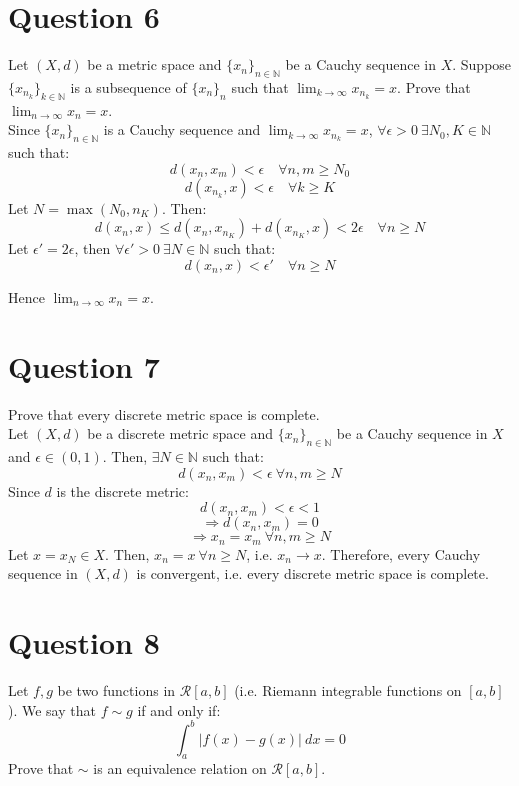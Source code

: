 \documentclass{article}
\begin{document}
\section{Question 6}

	Let $(X, d)$ be a metric space and $\{x_n\}_{n \in \mathbb{N}}$ be a Cauchy sequence in $X$.
	Suppose $\{x_{n_k}\}_{k \in \mathbb{N}}$ is a subsequence of $\{x_n\}_n$ such that 
	$\lim_{k \to \infty} x_{n_k} = x$.
	Prove that $\lim_{n \to \infty} x_n = x$. \\

	Since $\{x_n\}_{n \in \mathbb{N}}$ is a Cauchy sequence and $\lim_{k \to \infty} x_{n_k} = x$,
	$\forall \epsilon > 0 ~ \exists N_0, K \in \mathbb{N}$ such that:
	\[ d(x_n, x_m) < \epsilon \quad \forall n, m \ge N_0 \]
	\[ d(x_{n_k}, x) < \epsilon \quad \forall k \ge K \]
	Let $N = \max(N_0, n_K)$.
	Then:
	\[
		d(x_n, x) \le d(x_n, x_{n_K}) + d(x_{n_K}, x) < 2\epsilon
		\quad \forall n \ge N
	\]
	Let $\epsilon' = 2 \epsilon$, then $\forall \epsilon' > 0 ~ \exists N \in \mathbb{N}$
	such that:
	\[ d(x_n, x) < \epsilon' \quad \forall n \ge N \]

	Hence $\lim_{n \to \infty} x_n = x$.

\section{Question 7}

	Prove that every discrete metric space is complete. \\

	Let $(X, d)$ be a discrete metric space and $\{x_n\}_{n \in \mathbb{N}}$ be a Cauchy sequence
	in $X$ and $\epsilon \in (0, 1)$.
	Then, $\exists N \in \mathbb{N}$ such that:
	\[ d(x_n, x_m) < \epsilon ~ \forall n, m \ge N \]
	Since $d$ is the discrete metric:
	\[ d(x_n, x_m) < \epsilon < 1 \]
	\[ \Rightarrow d(x_n, x_m) = 0 \]
	\[ \Rightarrow x_n = x_m ~ \forall n, m \ge N \]
	Let $x = x_N \in X$.
	Then, $x_n = x ~ \forall n \ge N$, i.e. $x_n \to x$.
	Therefore, every Cauchy sequence in $(X, d)$ is convergent, i.e. every discrete metric space
	is complete.

\section{Question 8}

	Let $f, g$ be two functions in $\mathcal{R}[a, b]$ (i.e. Riemann integrable functions on
	$[a, b]$).
	We say that $f \sim g$ if and only if:
	\[ \int_{a}^{b} |f(x) - g(x)| ~ dx = 0 \]
	Prove that $\sim$ is an equivalence relation on $\mathcal{R}[a, b]$. \\
\end{document}
